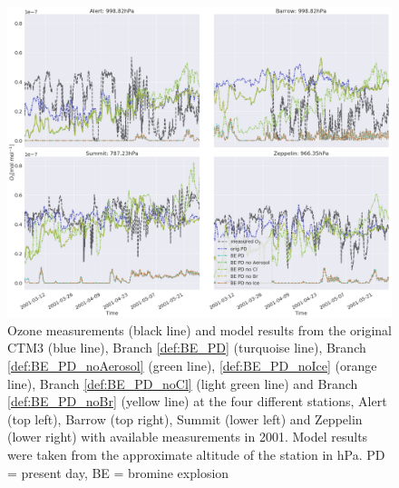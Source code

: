 \begin{figure}
    \centering
    \includegraphics[width = \linewidth]{Chapter6_Results/images/ozone_stationComp_2001/ozone_2001_testRemoveHetReacts.png}
    \caption{Ozone measurements (black line) and model results from the original CTM3 (blue line), Branch \ref{def:BE_PD} (turquoise line), Branch \ref{def:BE_PD_noAerosol} (green line), \ref{def:BE_PD_noIce} (orange line), Branch \ref{def:BE_PD_noCl} (light green line) and Branch \ref{def:BE_PD_noBr} (yellow line) at the four different stations, Alert (top left), Barrow (top right), Summit (lower left) and Zeppelin (lower right) with available measurements in 2001. Model results were taken from the approximate altitude of the station in hPa. PD = present day, BE = bromine explosion}
    \label{fig:test_RemoveHetReacts}
\end{figure}